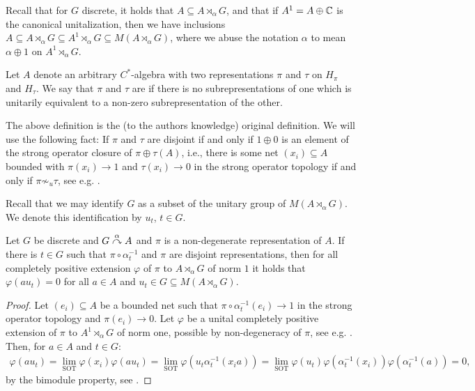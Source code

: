 Recall that for $G$ discrete, it holds that $A \subseteq A \rtimes_\alpha G$, and that if $A^1 = A \oplus \mathbb{C}$ is the canonical unitalization, then we have inclusions $ A \subseteq A \rtimes_\alpha G  \subseteq A^1 \rtimes_\alpha G \subseteq M(A \rtimes_\alpha G)$, where we abuse the notation $\alpha$ to mean $\alpha \oplus 1$ on $A^1 \rtimes_\alpha G$.
\begin{definition}
	Let $A$ denote an arbitrary $C^*$-algebra with two representations $\pi$ and $\tau$ on $H_\pi$ and $H_\tau$. We say that $\pi$ and $\tau$ are  if there is no subrepresentations of one which is unitarily equivalent to a non-zero subrepresentation of the other.
\end{definition}
\begin{remark}
	The above definition is the (to the authors knowledge) original definition. We will use the following fact: If $\pi$ and $\tau$ are disjoint if and only if $1 \oplus 0$ is an element of the strong operator closure of $\pi \oplus \tau (A)$, i.e., there is some net $(x_i) \subseteq A$ bounded with $\pi(x_i) \to 1$ and $\tau(x_i) \to 0$ in the strong operator topology if and only if  $\pi \not \sim _u \tau$, see e.g. \cite[Proposition 2.1.4]{arveson2012invitation}. 
\end{remark}
Recall that we may identify $G$ as a subset of the unitary group of $M(A \rtimes_\alpha G)$. We denote this identification by $u_t$, $t \in G$. 
\begin{lemma}
	Let $G$ be discrete and $G \stackrel{\alpha}{\curvearrowright} A$ and $\pi$ is a non-degenerate representation of $A$. If there is $t \in G$ such that $\pi \circ \alpha_t^{-1}$ and $\pi$ are disjoint representations, then for all completely positive extension $\varphi$ of $\pi$ to $A \rtimes_\alpha G$ of norm $1$ it holds that $\varphi(a u_t) = 0$ for all $a \in A$ and $u_t \in G \subseteq M(A \rtimes_\alpha G)$.
	\label{ASlem1}
\end{lemma}
\begin{proof}
	Let $(e_i) \subseteq A$ be a bounded net such that $\pi  \circ \alpha_{t}^{-1}(e_i) \to 1$ in the strong operator topology and $\pi(e_i) \to 0$. Let $\varphi$ be a unital completely positive extension of $\pi$ to $A^1  \rtimes_\alpha G$ of norm one, possible by non-degeneracy of $\pi$, see e.g. \cite[Proposition 2.2.1]{brown2008c}. Then, for $a \in A$ and $t \in G$:
	\begin{align*}
		\varphi(a u_t) = \lim_{\text{SOT}} \varphi(x_i )\varphi(a u_t) = \lim_{\text{SOT}} \varphi(u_t \alpha_{t}^{-1}(x_i a )) = \lim_{\text{SOT}} \varphi(u_t) \varphi(\alpha_t^{-1}(x_i))\varphi(\alpha_{t}^{-1}(a)) = 0,
	\end{align*}
	by the bimodule property, see \cite[Proposition 1.5.7 p.t (2)]{brown2008c}.
\end{proof}
